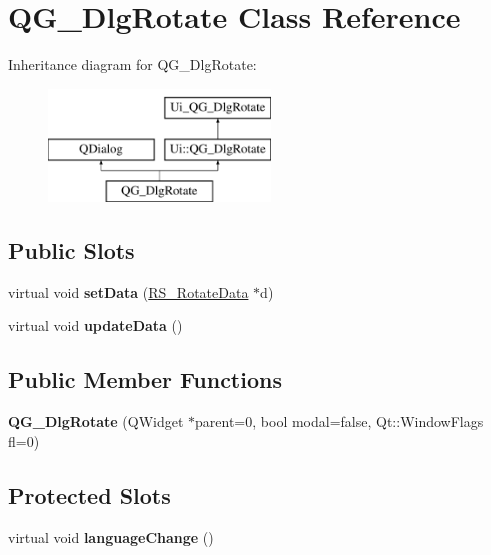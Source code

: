 \hypertarget{classQG__DlgRotate}{\section{Q\-G\-\_\-\-Dlg\-Rotate Class Reference}
\label{classQG__DlgRotate}
}
Inheritance diagram for Q\-G\-\_\-\-Dlg\-Rotate\-:\begin{figure}[H]
\begin{center}
\leavevmode
\includegraphics[height=3.000000cm]{classQG__DlgRotate}
\end{center}
\end{figure}
\subsection*{Public Slots}
\begin{DoxyCompactItemize}
\item 
\hypertarget{classQG__DlgRotate_ae6ce46e61ed2708753d0dcb154d2735f}{virtual void {\bfseries set\-Data} (\hyperlink{classRS__RotateData}{R\-S\-\_\-\-Rotate\-Data} $\ast$d)}\label{classQG__DlgRotate_ae6ce46e61ed2708753d0dcb154d2735f}

\item 
\hypertarget{classQG__DlgRotate_a4993e7736e7c5c5c2682064f64900e35}{virtual void {\bfseries update\-Data} ()}\label{classQG__DlgRotate_a4993e7736e7c5c5c2682064f64900e35}

\end{DoxyCompactItemize}
\subsection*{Public Member Functions}
\begin{DoxyCompactItemize}
\item 
\hypertarget{classQG__DlgRotate_addf18817f65f67335a085fc051d6f2db}{{\bfseries Q\-G\-\_\-\-Dlg\-Rotate} (Q\-Widget $\ast$parent=0, bool modal=false, Qt\-::\-Window\-Flags fl=0)}\label{classQG__DlgRotate_addf18817f65f67335a085fc051d6f2db}

\end{DoxyCompactItemize}
\subsection*{Protected Slots}
\begin{DoxyCompactItemize}
\item 
\hypertarget{classQG__DlgRotate_a9c5411707993b13533fa9e50d56173c2}{virtual void {\bfseries language\-Change} ()}\label{classQG__DlgRotate_a9c5411707993b13533fa9e50d56173c2}

\end{DoxyCompactItemize}
